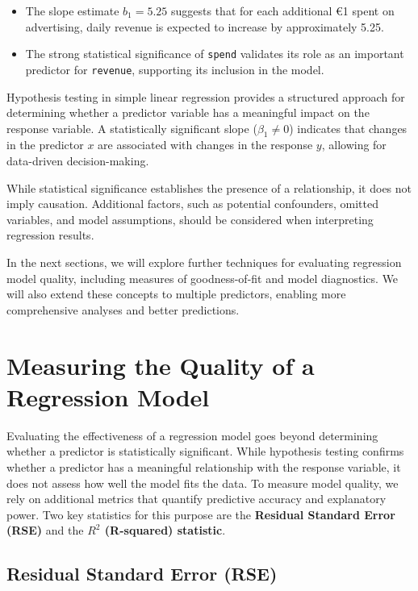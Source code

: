 \documentclass[
  11pt,
]{book}
\newcommand{\passthrough}[1]{#1}
\providecommand{\tightlist}{%
  \setlength{\itemsep}{0pt}\setlength{\parskip}{0pt}}
\theoremstyle{definition}
\theoremstyle{definition}
\theoremstyle{definition}
\theoremstyle{definition}
\theoremstyle{remark}
\begin{document}
\begin{itemize}
\tightlist
\item
  The slope estimate \(b_1 = 5.25\) suggests that for each additional €1 spent on advertising, daily revenue is expected to increase by approximately 5.25.\\
\item
  The strong statistical significance of \passthrough{\lstinline!spend!} validates its role as an important predictor for \passthrough{\lstinline!revenue!}, supporting its inclusion in the model.
\end{itemize}

Hypothesis testing in simple linear regression provides a structured approach for determining whether a predictor variable has a meaningful impact on the response variable. A statistically significant slope (\(\beta_1 \neq 0\)) indicates that changes in the predictor \(x\) are associated with changes in the response \(y\), allowing for data-driven decision-making.

While statistical significance establishes the presence of a relationship, it does not imply causation. Additional factors, such as potential confounders, omitted variables, and model assumptions, should be considered when interpreting regression results.

In the next sections, we will explore further techniques for evaluating regression model quality, including measures of goodness-of-fit and model diagnostics. We will also extend these concepts to multiple predictors, enabling more comprehensive analyses and better predictions.

\section*{Measuring the Quality of a Regression Model}\label{measuring-the-quality-of-a-regression-model}


Evaluating the effectiveness of a regression model goes beyond determining whether a predictor is statistically significant. While hypothesis testing confirms whether a predictor has a meaningful relationship with the response variable, it does not assess how well the model fits the data. To measure model quality, we rely on additional metrics that quantify predictive accuracy and explanatory power. Two key statistics for this purpose are the \textbf{Residual Standard Error (RSE)} and the \textbf{\(R^2\) (R-squared) statistic}.

\subsection*{Residual Standard Error (RSE)}\label{residual-standard-error-rse}
\end{document}
